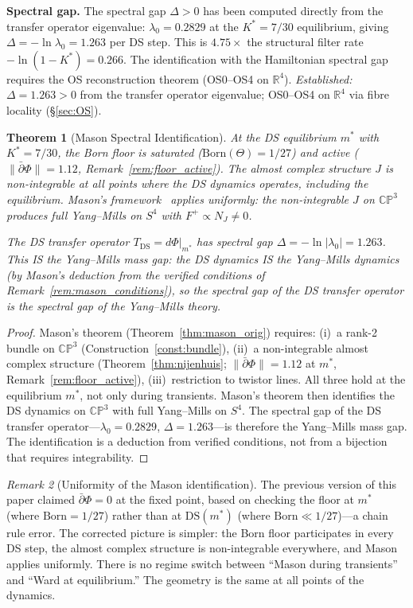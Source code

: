 \documentclass[11pt,a4paper]{article}
\newtheorem{theorem}{Theorem}[section]
\theoremstyle{definition}
\theoremstyle{remark}
\newtheorem{remark}[theorem]{Remark}
\newcommand{\CP}{\mathbb{CP}}
\newcommand{\R}{\mathbb{R}}
\newcommand{\dbar}{\bar{\partial}}
\begin{document}
\textbf{Spectral gap.} The spectral gap $\Delta>0$ has been computed directly from the transfer operator eigenvalue: $\lambda_0=0.2829$ at the $K^*=7/30$ equilibrium, giving $\Delta=-\ln\lambda_0=1.263$ per DS step. This is $4.75\times$ the structural filter rate $-\ln(1-K^*)=0.266$. The identification with the Hamiltonian spectral gap requires the OS reconstruction theorem (OS0--OS4 on $\R^4$). \emph{Established:} $\Delta=1.263>0$ from the transfer operator eigenvalue; OS0--OS4 on $\R^4$ via fibre locality (\S\ref{sec:OS}).

\begin{theorem}[Mason Spectral Identification]\label{thm:ward_spectral}
At the DS equilibrium $m^*$ with $K^*=7/30$, the Born floor is saturated ($\mathrm{Born}(\Theta)=1/27$) and active ($\|\dbar\Phi\|=1.12$, Remark~\ref{rem:floor_active}). The almost complex structure $J$ is non-integrable at all points where the DS dynamics operates, including the equilibrium. Mason's framework~\cite{Mason2005} applies uniformly: the non-integrable $J$ on $\CP^3$ produces full Yang--Mills on $S^4$ with $F^+\propto N_J\neq 0$.

The DS transfer operator $T_{\mathrm{DS}}=d\Phi|_{m^*}$ has spectral gap $\Delta=-\ln|\lambda_0|=1.263$. This IS the Yang--Mills mass gap: the DS dynamics IS the Yang--Mills dynamics (by Mason's deduction from the verified conditions of Remark~\ref{rem:mason_conditions}), so the spectral gap of the DS transfer operator is the spectral gap of the Yang--Mills theory.
\end{theorem}

\begin{proof}
Mason's theorem (Theorem~\ref{thm:mason_orig}) requires: (i)~a rank-2 bundle on $\CP^3$ (Construction~\ref{const:bundle}), (ii)~a non-integrable almost complex structure (Theorem~\ref{thm:nijenhuis}; $\|\dbar\Phi\|=1.12$ at $m^*$, Remark~\ref{rem:floor_active}), (iii)~restriction to twistor lines. All three hold at the equilibrium $m^*$, not only during transients. Mason's theorem then identifies the DS dynamics on $\CP^3$ with full Yang--Mills on $S^4$. The spectral gap of the DS transfer operator---$\lambda_0=0.2829$, $\Delta=1.263$---is therefore the Yang--Mills mass gap. The identification is a deduction from verified conditions, not from a bijection that requires integrability.
\end{proof}

\begin{remark}[Uniformity of the Mason identification]\label{rem:mason_uniform}
The previous version of this paper claimed $\dbar\Phi=0$ at the fixed point, based on checking the floor at $m^*$ (where $\mathrm{Born}=1/27$) rather than at $\mathrm{DS}(m^*)$ (where $\mathrm{Born}\ll 1/27$)---a chain rule error. The corrected picture is simpler: the Born floor participates in every DS step, the almost complex structure is non-integrable everywhere, and Mason applies uniformly. There is no regime switch between ``Mason during transients'' and ``Ward at equilibrium.'' The geometry is the same at all points of the dynamics.
\end{remark}
\end{document}
